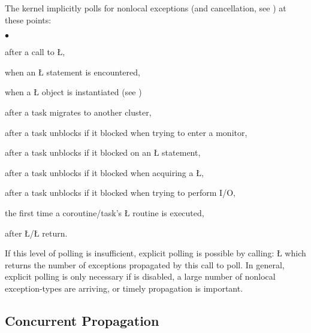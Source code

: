 \documentclass[openright,twoside]{report}
\begin{document}
The\label{p:ListPollingPoints} \uC kernel implicitly polls for nonlocal exceptions (and cancellation, see ) at these points:
\begin{list}{$\bullet$}{\topsep=3pt\parsep=0pt\itemsep=0pt}
\item after a call to \LGinlinetrue\LGbegin\lgrinde\L{}\endlgrinde\LGend{},
\item when an \LGinlinetrue\LGbegin\lgrinde\L{}\endlgrinde\LGend{} statement is encountered,
\item when a \LGinlinetrue\LGbegin\lgrinde\L{}\endlgrinde\LGend{} object is instantiated (see ) 
\item after a task migrates to another cluster,
\item after a task unblocks if it blocked when trying to enter a monitor,
\item after a task unblocks if it blocked on an \LGinlinetrue\LGbegin\lgrinde\L{}\endlgrinde\LGend{} statement,
\item after a task unblocks if it blocked when acquiring a \LGinlinetrue\LGbegin\lgrinde\L{}\endlgrinde\LGend{},
\item after a task unblocks if it blocked when trying to perform I/O,
\item the first time a coroutine/task's \LGinlinetrue\LGbegin\lgrinde\L{}\endlgrinde\LGend{} routine is executed,
\item after \LGinlinetrue\LGbegin\lgrinde\L{}\endlgrinde\LGend{}/\LGinlinetrue\LGbegin\lgrinde\L{}\endlgrinde\LGend{} return.
\end{list}
If this level of polling is insufficient, explicit polling is possible by calling:
\LGinlinefalse\LGbegin\lgrinde
\L{}
\endlgrinde\LGend
{}%
%
which returns the number of exceptions propagated by this call to poll.
In general, explicit polling is only necessary if  is disabled, a large number of nonlocal exception-types are arriving, or timely propagation is important.


\subsection{Concurrent Propagation}
\label{s:ConcurrentPropagation}
\end{document}

